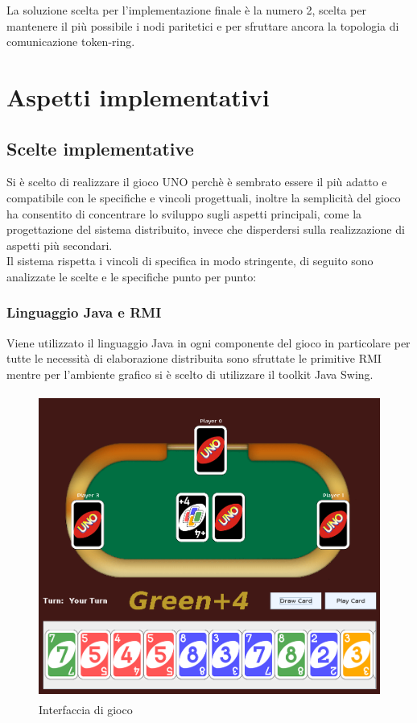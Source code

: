 \documentclass[10pt,a4paper]{article}
\begin{document}
La soluzione scelta per l'implementazione finale è la numero 2, scelta per mantenere il più possibile i nodi paritetici e per sfruttare ancora la topologia di comunicazione token-ring.

\section{Aspetti implementativi}
\subsection{Scelte implementative}
Si è scelto di realizzare il gioco UNO perchè è sembrato essere il più adatto e compatibile con le specifiche e vincoli progettuali, inoltre la semplicità del gioco ha consentito di concentrare lo sviluppo sugli aspetti principali, come la progettazione del sistema distribuito, invece che disperdersi sulla realizzazione di aspetti più secondari.\\
Il sistema rispetta i vincoli di specifica in modo stringente, di seguito sono analizzate le scelte e le specifiche punto per punto:

\subsubsection{Linguaggio Java e RMI}
Viene utilizzato il linguaggio Java in ogni componente del gioco in particolare per tutte le necessità di elaborazione distribuita sono sfruttate le primitive RMI mentre per l'ambiente grafico si è scelto di utilizzare il toolkit Java Swing.

\begin{figure}[H]
\begin{center}
\includegraphics[height=10cm, keepaspectratio]{Selection_011.png}
\caption{Interfaccia di gioco}
\end{center}
\end{figure}
\end{document}
